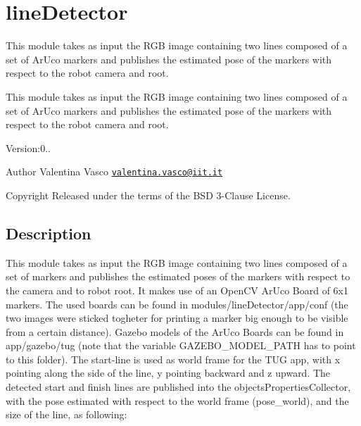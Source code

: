 \section{line\+Detector}
\label{group__lineDetector}


This module takes as input the R\+GB image containing two lines composed of a set of Ar\+Uco markers and publishes the estimated pose of the markers with respect to the robot camera and root.  


This module takes as input the R\+GB image containing two lines composed of a set of Ar\+Uco markers and publishes the estimated pose of the markers with respect to the robot camera and root. 

Version\+:0.. \begin{DoxyAuthor}{Author}
Valentina Vasco \href{mailto:valentina.vasco@iit.it}{\tt valentina.\+vasco@iit.\+it} ~\newline
 
\end{DoxyAuthor}
\begin{DoxyCopyright}{Copyright}
Released under the terms of the B\+SD 3-\/\+Clause License. 
\end{DoxyCopyright}
\hypertarget{group__skeletonViewer_intro_sec}{}\subsection{Description}\label{group__skeletonViewer_intro_sec}
This module takes as input the R\+GB image containing two lines composed of a set of markers and publishes the estimated poses of the markers with respect to the camera and to robot root. It makes use of an Open\+CV Ar\+Uco Board of 6x1 markers. The used boards can be found in {\ttfamily modules/line\+Detector/app/conf} (the two images were sticked togheter for printing a marker big enough to be visible from a certain distance). Gazebo models of the Ar\+Uco Boards can be found in {\ttfamily app/gazebo/tug} (note that the variable {\ttfamily G\+A\+Z\+E\+B\+O\+\_\+\+M\+O\+D\+E\+L\+\_\+\+P\+A\+TH} has to point to this folder). The start-\/line is used as world frame for the T\+UG app, with {\ttfamily x} pointing along the side of the line, {\ttfamily y} pointing backward and {\ttfamily z} upward. The detected start and finish lines are published into the objects\+Properties\+Collector, with the pose estimated with respect to the world frame ({\ttfamily pose\+\_\+world}), and the size of the line, as following\+:


